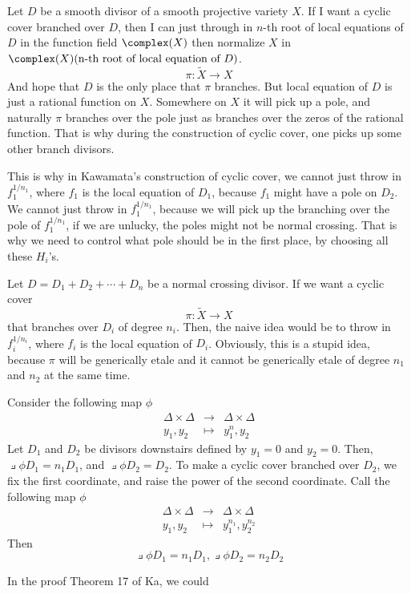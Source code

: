 \documentclass{article}
\begin{document}
Let $D$ be a smooth divisor of a smooth projective variety $X$. 
If I want a cyclic cover branched over $D$, then I can just through in
$n$-th root of local equations of $D$ in the function field $\complex(X)$ then
normalize $X$ in $\complex(X)(\text{n-th root of local equation of $D$})$.
\[
    \pi: \tilde{X} \rightarrow X
\]
And hope that $D$ is the only place that $\pi$ branches. But local equation
of $D$ is just a rational function on $X$. Somewhere on $X$ it will pick up
a pole, and naturally $\pi$ branches over the pole just as branches over the zeros
of the rational function. That is why during the construction of cyclic cover, one
picks up some other branch divisors.

This is why in Kawamata's construction of cyclic cover, we cannot just throw in
$f_1^{1/n_1}$, where $f_1$ is the local equation of $D_1$, because $f_1$ might 
have a pole on $D_2$. We cannot just throw in $f_1^{1/n_1}$, because we will 
pick up the branching over the pole of $f_1^{1/n_1}$, if we are unlucky, the 
poles might not be normal crossing. That is why we need to control what pole
should be in the first place, by choosing all these $H_i$'s.
 

Let $D = D_1 + D_2 +\cdots + D_n$ be a normal crossing divisor. If we want a 
cyclic cover 
\[
    \pi: \tilde{X} \rightarrow X
\]
that branches over $D_i$ of degree $n_i$. Then, the naive idea would be 
to throw in $f_i^{1/n_i}$, where $f_i$ is the local equation of $D_i$. 
Obviously, this is a stupid idea, because $\pi$ will be generically etale
and it cannot be generically etale of degree $n_1$ and $n_2$ at the same
time. 

Consider the following map $\phi$
\begin{align*}
    \Delta\times\Delta & \rightarrow & \Delta\times\Delta \\
      y_1, y_2         & \mapsto     & y_1^n, y_2
\end{align*}
Let $D_1$ and $D_2$ be divisors downstairs defined by $y_1=0$ and $y_2=0$.
Then, $\pullback{\phi}D_1 = n_1D_1$, and $\pullback{\phi}D_2 = D_2$. To make
a cyclic cover branched over $D_2$, we fix the first coordinate, and raise the 
power of the second coordinate. Call the following map $\phi$
\begin{align*}
    \Delta\times\Delta & \rightarrow & \Delta\times\Delta \\
      y_1, y_2         & \mapsto     & y_1^{n_1}, y_2^{n_2}
\end{align*}
Then
\[
    \pullback{\phi}D_1 = n_1D_1, \pullback{\phi}D_2 = n_2D_2
\]


In the proof Theorem 17 of Ka, we could
\end{document}
